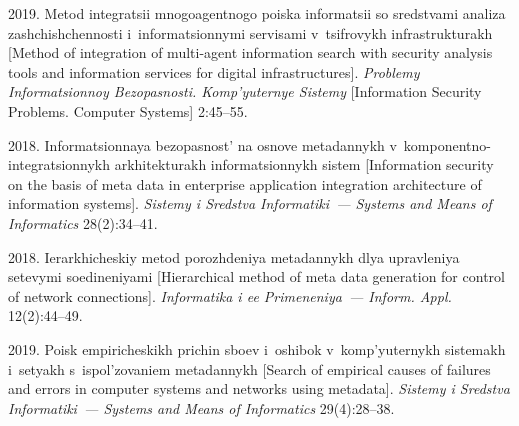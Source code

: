  \begin{multicols}{2}

\renewcommand{\bibname}{\protect\rmfamily References}

{\small\frenchspacing
 {%
 \begin{thebibliography}{99}


 2019. Metod integratsii mnogoagentnogo poiska informatsii so sredstvami analiza 
zashchishchennosti i~informatsionnymi servisami v~tsifrovykh infrastrukturakh [Method of 
integration of multi-agent information search with security analysis tools and information services for 
digital infrastructures]. \textit{Problemy Informatsionnoy Bezopasnosti. Komp'yuternye Sistemy} 
[Information Security Problems. Computer Systems] 2:45--55.

 2018. Informatsionnaya bezopasnost' na osnove metadannykh v~komponentno-integratsionnykh 
arkhitekturakh informatsionnykh sistem [Information security on the basis of meta data in enterprise 
application integration architecture of information systems]. \textit{Sistemy i Sredstva Informatiki~--- 
Systems and Means of Informatics} 28(2):34--41.

 2018. Ierarkhicheskiy metod 
porozhdeniya metadannykh dlya upravleniya setevymi soedineniyami [Hierarchical method of meta 
data generation for control of network connections]. \textit{Informatika i ee Primeneniya~--- Inform. 
Appl.} 12(2):44--49.

2019. Poisk empiricheskikh prichin sboev i~oshibok v~komp'yuternykh sistemakh i~setyakh 
s~ispol'zovaniem metadannykh [Search of empirical causes of failures and errors in computer systems 
and networks using metadata]. \textit{Sistemy i Sredstva Informatiki~--- Systems and Means of 
Informatics} 29(4):28--38.



\end{thebibliography}}}
\end{multicols}
